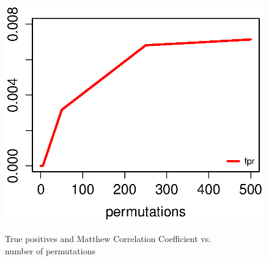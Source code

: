 \begin{figure}
\begin{minipage}{.55\textwidth}
  \caption{True positives and Matthew Correlation Coefficient vs. \\ number of permutations}
  \label{fig:tp_mcc}
\end{minipage}%
\begin{minipage}{.55\textwidth}
  \centering
  \includegraphics[width=.8\linewidth]{fpr.eps}
  \label{fig:fpr_perm}
\end{minipage}
\label{fig:global}
\end{figure}


